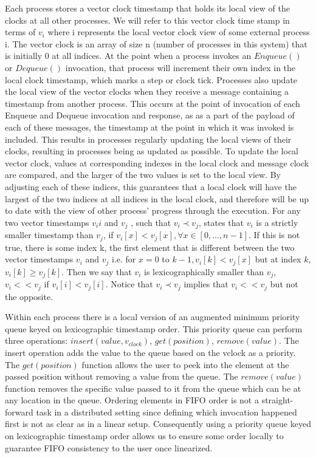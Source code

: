 \documentclass[a4paper,USenglish]{lipics-v2021} %
\begin{document}
Each process stores a vector clock timestamp that holds its local view of the clocks at all other processes. We will refer to this vector clock time stamp in terms of $v_i$ where i represents the local vector clock view of some external process i. The vector clock is an array of size n (number of processes in this system) that is initially 0 at all indices. At the point when a process invokes an $Enqueue()$ or $Dequeue()$ invocation, that process will increment their own index in the local clock timestamp, which marks a step or clock tick.  Processes also update the local view of the vector clocks when they receive a message containing a timestamp from another process. This occurs at the point of invocation of each Enqueue and Dequeue invocation and response, as as a part of the payload of each of these messages, the timestamp at the point in which it was invoked is included. This results in processes regularly updating the local views of their clocks, resulting in processes being as updated as possible. To update the local vector clock, values at corresponding indexes in the local clock and message clock are compared, and the larger of the two values is set to the local view. By adjusting each of these indices, this guarantees that a local clock will have the largest of the two indices at all indices in the local clock, and therefore will be up to date with the view of other process' progress through the execution.  For any two vector timestamps $v_ii$ and $v_j$ , such that $v_i \prec  v_j$, states that $v_i$ is a strictly smaller timestamp than $v_j$, if $v_i[x] < v_j[x],\forall x \in [0, \dots, n-1]$. If this is not true, there is some index k, the first element that is different between the two vector timestamps $v_i$ and $v_j$ i.e. for $x = 0$ to $k-1, v_i[k] < v_j[x]$ but at index $k$, $v_i[k] \geq v_j [k]$. Then we say that $v_i$ is lexicographically smaller than $v_j$, $v_i << v_j$ if $v_i[i] < v_j[i]$. Notice that $v_i \prec v_j$ implies that $v_i << v_j$ but not the opposite.

Within each process there is a local version of an augmented minimum priority queue keyed on lexicographic timestamp order. This priority queue can perform three operations: $insert(value, v_{clock})$, $get(position)$, $remove(value)$. The insert operation adds the value to the queue based on the vclock as a priority. The $get(position)$ function allows the user to peek into the element at the passed position without removing a value from the queue. The $remove(value)$ function removes the specific value passed to it from the queue which can be at any location in the queue. Ordering elements in FIFO order is not a straight-forward task in a distributed setting since defining which invocation happened first is not as clear as in a linear setup. Consequently using a priority queue keyed on lexicographic timestamp order allows us to ensure some order locally to guarantee FIFO consistency to the user once linearized.
\end{document}
